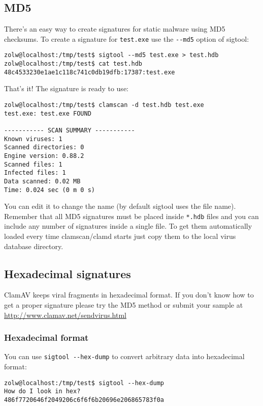 \documentclass[a4paper,titlepage,12pt]{article}
\begin{document}
    \subsection{MD5}
    There's an easy way to create signatures for static malware using MD5
    checksums. To create a signature for \verb+test.exe+ use the \verb+--md5+
    option of sigtool:
    \begin{verbatim}
zolw@localhost:/tmp/test$ sigtool --md5 test.exe > test.hdb
zolw@localhost:/tmp/test$ cat test.hdb 
48c4533230e1ae1c118c741c0db19dfb:17387:test.exe
    \end{verbatim}
    That's it! The signature is ready to use:
    \begin{verbatim}
zolw@localhost:/tmp/test$ clamscan -d test.hdb test.exe 
test.exe: test.exe FOUND

----------- SCAN SUMMARY -----------
Known viruses: 1
Scanned directories: 0
Engine version: 0.88.2
Scanned files: 1
Infected files: 1
Data scanned: 0.02 MB
Time: 0.024 sec (0 m 0 s)
    \end{verbatim}
    You can edit it to change the name (by default sigtool uses the file name).
    Remember that all MD5 signatures must be placed inside \verb+*.hdb+ files
    and you can include any number of signatures inside a single file. To get
    them automatically loaded every time clamscan/clamd starts just copy them
    to the local virus database directory.

    \subsection{Hexadecimal signatures}
    ClamAV keeps viral fragments in hexadecimal format. If you don't know how
    to get a proper signature please try the MD5 method or submit your sample
    at \url{http://www.clamav.net/sendvirus.html}

    \subsubsection{Hexadecimal format}
    You can use \verb+sigtool --hex-dump+ to convert arbitrary data into
    hexadecimal format:
    \begin{verbatim}
zolw@localhost:/tmp/test$ sigtool --hex-dump
How do I look in hex?
486f7720646f2049206c6f6f6b20696e206865783f0a
    \end{verbatim}
\end{document}
